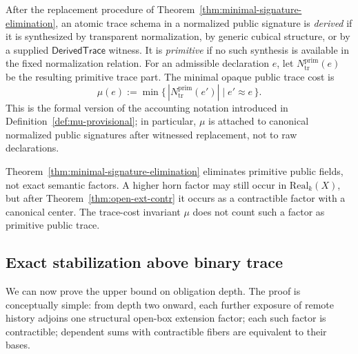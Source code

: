 \documentclass{lmcs}
\begin{document}
\begin{defi}
\label{def:primitive-status-mu}
After the replacement procedure of Theorem~\ref{thm:minimal-signature-elimination}, an atomic
trace schema in a normalized public signature is \emph{derived} if it is synthesized by
transparent normalization, by generic cubical structure, or by a supplied
\(\mathsf{DerivedTrace}\) witness.  It is \emph{primitive} if no such synthesis is available in
the fixed normalization relation.  For an admissible declaration \(e\), let
\(N_{\mathrm{tr}}^{\mathrm{prim}}(e)\) be the resulting primitive trace part.  The minimal
opaque public trace cost is
\[
  \mu(e)
  :=
  \min\{\, |N_{\mathrm{tr}}^{\mathrm{prim}}(e')| \mid e'\approx e \,\}.
\]
This is the formal version of the accounting notation introduced in
Definition~\ref{def:mu-provisional}; in particular, \(\mu\) is attached to canonical
normalized public signatures after witnessed replacement, not to raw declarations.
\end{defi}

\begin{rem}
Theorem~\ref{thm:minimal-signature-elimination} eliminates primitive public fields, not exact
semantic factors.  A higher horn factor may still occur in \(\mathrm{Real}_k(X)\), but after
Theorem~\ref{thm:open-ext-contr} it occurs as a contractible factor with a canonical center.
The trace-cost invariant \(\mu\) does not count such a factor as primitive public trace.
\end{rem}

\subsection{Exact stabilization above binary trace}
\label{subsec:exact-stabilization}

We can now prove the upper bound on obligation depth.  The proof is conceptually simple:
from depth two onward, each further exposure of remote history adjoins one structural
open-box extension factor; each such factor is contractible; dependent sums with
contractible fibers are equivalent to their bases.
\end{document}

